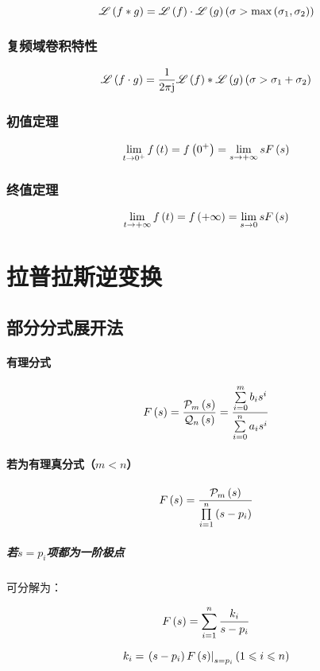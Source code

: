 \documentclass{article}
\begin{document}
\[\mathscr L\left(f\ast g\right)=\mathscr L\left(f\right)\cdot\mathscr L\left(g\right)
    \left(\sigma>\max\left(\sigma_1,\sigma_2\right)\right)\]

\subsubsection{复频域卷积特性}

\[\mathscr L\left(f\cdot g\right)=
    \frac1{2\pi\mathrm j}\mathscr L\left(f\right)\ast\mathscr L\left(g\right)
    \left(\sigma>\sigma_1+\sigma_2\right)\]

\subsubsection{初值定理}

\[\lim_{t\to0^+}f\left(t\right)=f\left(0^+\right)=\lim_{s\to+\infty}sF\left(s\right)\]

\subsubsection{终值定理}

\[\lim_{t\to+\infty}f\left(t\right)=f\left(+\infty\right)=\lim_{s\to0}sF\left(s\right)\]

\section{拉普拉斯逆变换}

\subsection{部分分式展开法\label{拉普拉斯变换部分分式展开法}}

\paragraph{有理分式}

\[F\left(s\right)=\frac{\mathcal P_m\left(s\right)}{\mathcal Q_n\left(s\right)}
    =\frac{\sum\limits_{i=0}^mb_is^i}{\sum\limits_{i=0}^na_is^i}\]

\paragraph{若为有理真分式（$m<n$）}

\[F\left(s\right)=\frac{\mathcal P_m\left(s\right)}{\prod\limits_{i=1}^n\left(s-p_i\right)}\]

\subparagraph{若$s=p_i$项都为一阶极点}

可分解为：

\[F\left(s\right)=\sum_{i=1}^n\frac{k_i}{s-p_i}\]

\[k_i=\left.\left(s-p_i\right)F\left(s\right)\right|_{s=p_i}\left(1\leqslant i\leqslant n\right)\]
\end{document}
